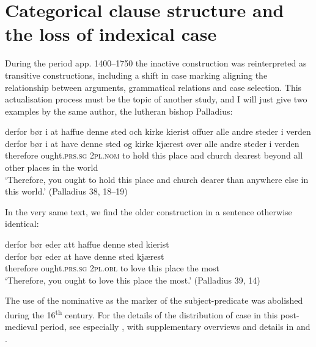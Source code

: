 \documentclass[output=paper]{langscibook}
\begin{document}
\section{Categorical clause structure and the loss of indexical case} \label{heltoft:5}

During the period app. 1400--1750 the inactive construction was reinterpreted as transitive constructions, including a shift in case marking aligning the relationship between arguments, grammatical relations and case selection. This actualisation process must be the topic of another study, and I will just give two examples by the same author, the lutheran bishop Palladius:

\begin{exe}   
\ex   \label{ex:heltoft:51}
    \glll derfor bør i at haffue denne sted och kirke kierist offuer alle andre steder i verden\\
          derfor    bør i  at have  denne sted og kirke kjærest over alle andre steder i verden \\
          therefore  ought.\textsc{prs.sg}  \textsc{2pl.nom}  to hold   this place and church dearest beyond all other places in {the world}\\
    \glt ‘Therefore, you ought to hold this place and church dearer than anywhere else in this world.' (Palladius 38, 18--19)
\end{exe}

In the very same text, we find the older construction in a sentence otherwise identical:  

\begin{exe}
\ex \label{ex:heltoft:52}
    \glll derfor bør eder att haffue denne sted kierist\\
          derfor bør eder at have denne sted kjærest \\
          therefore  ought.\textsc{prs.sg}  \textsc{2pl.obl}   to love this place {the most}\\
    \glt ‘Therefore, you ought to love this place the most.' (Palladius 39, 14)
\end{exe}

\begin{sloppypar}
The use of the nominative as the marker of the subject-predicate was abolished during the 16\textsuperscript{th} century. For the details of the distribution of case in this post-medieval period, see especially \citet{Jensen2017, Jensen2018}, with supplementary overviews and details in \citet{Heltoft2019} and \citet{Jørgensen2000}.
\end{sloppypar}
\end{document}
